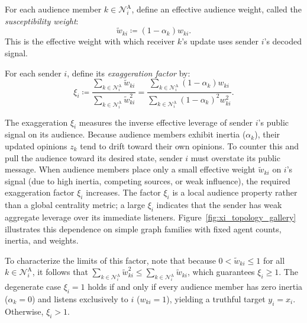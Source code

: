 \documentclass[journal,twoside,web]{ieeecolor}
\begin{document}
For each audience member $k\in\mathcal N_i^{\mathrm A}$, define an effective audience weight, called the \emph{susceptibility weight}:
\begin{equation*}
    \widetilde{w}_{ki}\coloneqq (1-\alpha_k)w_{ki}.
\end{equation*}
This is the effective weight with which receiver $k$'s update uses sender $i$'s decoded signal.

\begin{definition}
    \label{def:exagg}
    For each sender $i$, define its \emph{exaggeration factor} by:
    \begin{equation}
        \label{eq:exag_def}
        \xi_i \coloneqq \frac{\sum_{k\in\mathcal N_i^{\mathrm A}}\widetilde{w}_{ki}}    {\sum_{k\in\mathcal N_i^{\mathrm A}}\widetilde{w}_{ki}^2} = \frac{\sum_{k\in\mathcal N_i^{\mathrm A}}(1-\alpha_k)w_{ki}}    {\sum_{k\in\mathcal N_i^{\mathrm A}}(1-\alpha_k)^2w_{ki}^2}.
    \end{equation}
\end{definition}

The exaggeration $\xi_i$ measures the inverse effective leverage of sender $i$'s public signal on its audience. Because audience members exhibit inertia ($\alpha_k$), their updated opinions $z_k$ tend to drift toward their own opinions. To counter this and pull the audience toward its desired state, sender $i$ must overstate its public message. When audience members place only a small effective weight $\widetilde{w}_{ki}$ on $i$'s signal (due to high inertia, competing sources, or weak influence), the required exaggeration factor $\xi_i$ increases. The factor $\xi_i$ is a local audience property rather than a global centrality metric; a large $\xi_i$ indicates that the sender has weak aggregate leverage over its immediate listeners. Figure~\ref{fig:xi_topology_gallery} illustrates this dependence on simple graph families with fixed agent counts, inertia, and weights.

To characterize the limits of this factor, note that because $0 < \widetilde{w}_{ki} \le 1$ for all $k \in \mathcal{N}_i^{\mathrm{A}}$, it follows that $\sum_{k \in \mathcal{N}_i^{\mathrm{A}}} \widetilde{w}_{ki}^2 \le \sum_{k \in \mathcal{N}_i^{\mathrm{A}}} \widetilde{w}_{ki}$, which guarantees $\xi_i \ge 1$. The degenerate case $\xi_i = 1$ holds if and only if every audience member has zero inertia ($\alpha_k = 0$) and listens exclusively to $i$ ($w_{ki} = 1$), yielding a truthful target $y_i = x_i$. Otherwise, $\xi_i > 1$.
\end{document}
